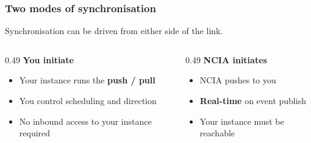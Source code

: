 \begin{frame}
    \frametitle{Two modes of synchronisation}

    Synchronisation can be driven from either side of the link.

    \vspace{0.5em}

    \begin{center}
        \begin{columns}[T]
            \begin{column}{0.49\textwidth}
                \card{\linewidth}{2.5em}
                    {{\Large\faArrowRight}\hspace{0.3em}\textbf{You initiate}}
                    {
                        \begin{itemize}
                            \item Your instance runs the \textbf{push / pull}
                            \item You control scheduling and direction
                            \item No inbound access to your instance required
                        \end{itemize}
                    }
            \end{column}
            \begin{column}{0.49\textwidth}
                \card{\linewidth}{2.5em}
                    {{\Large\faArrowLeft}\hspace{0.3em}\textbf{NCIA initiates}}
                    {
                        \begin{itemize}
                            \item NCIA pushes to you
                            \item \textbf{Real-time} on event publish
                            \item Your instance must be reachable
                        \end{itemize}
                    }
            \end{column}
        \end{columns}
    \end{center}
\end{frame}


